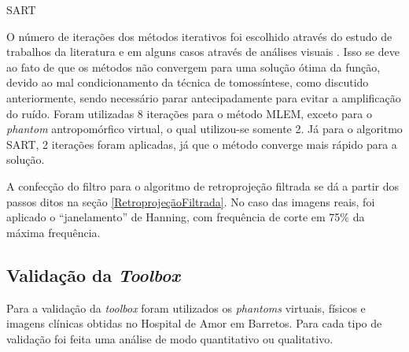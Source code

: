 \begin{algorithm}[htb]
	\caption{\acs{SART}}
	\label{alg:algSART}
\end{algorithm}

O número de iterações dos métodos iterativos foi escolhido através do estudo de trabalhos da literatura e em alguns casos através de análises visuais \cite{wu2004comparison,zhang2006comparative}. Isso se deve ao fato de que os métodos não convergem para uma solução ótima da função, devido ao mal condicionamento da técnica de tomossíntese, como discutido anteriormente, sendo necessário parar antecipadamente para evitar a amplificação do ruído. Foram utilizadas 8 iterações para o método \acs{MLEM}, exceto para o \textit{phantom} antropomórfico virtual, o qual utilizou-se somente 2. Já para o algoritmo \acs{SART}, 2 iterações foram aplicadas, já que o método converge mais rápido para a solução. 

A confecção do filtro para o algoritmo de retroprojeção filtrada se dá a partir dos passos ditos na seção \ref{RetroprojeçãoFiltrada}. No caso das imagens reais, foi aplicado o ``janelamento'' de Hanning, com frequência de corte em 75\% da máxima frequência.

\subsection{Validação da \textit{Toolbox}} 

Para a validação da \textit{toolbox} foram utilizados os \textit{phantoms} virtuais, físicos e imagens clínicas obtidas no Hospital de Amor em Barretos. Para cada tipo de validação foi feita uma análise de modo quantitativo ou qualitativo.

